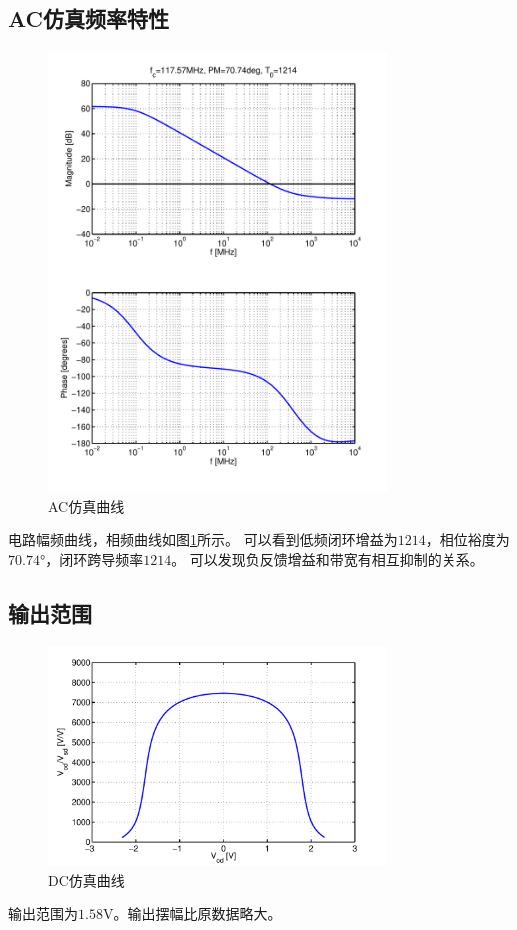 \documentclass[a4paper]{article}
\newcommand{\uV}{\si{\volt}}
\newcommand{\udeg}{\si{\degree}}
\begin{document}
\subsection{AC仿真频率特性}
\begin{figure}[htb]
    \begin{center}
        \includegraphics[width=0.8\textwidth]{fast/ac.pdf}
    \end{center}
    \caption{AC仿真曲线}
    \label{fastac}
\end{figure}
电路幅频曲线，相频曲线如图\ref{fastac}所示。
可以看到低频闭环增益为$1214$，相位裕度为$70.74\udeg$，闭环跨导频率$1214$。
可以发现负反馈增益和带宽有相互抑制的关系。
\newpage
\clearpage
\subsection{输出范围}
\begin{figure}[htb]
    \begin{center}
        \includegraphics[width=0.8\textwidth]{fast/dc.pdf}
    \end{center}
    \caption{DC仿真曲线}
    \label{fastdc}
\end{figure}
输出范围为$1.58\uV$。输出摆幅比原数据略大。
\newpage
\clearpage
\end{document}
